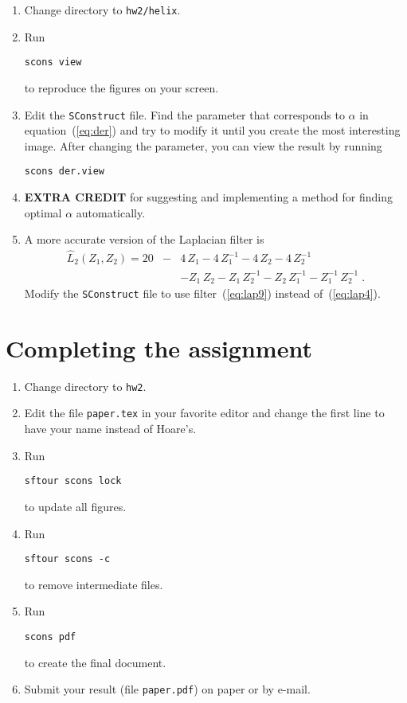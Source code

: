 \begin{enumerate}
\item Change directory to \texttt{hw2/helix}.
\item Run 
\begin{verbatim}
scons view
\end{verbatim}
to reproduce the figures on your screen.
\item Edit the \texttt{SConstruct} file. Find the parameter that corresponds to $\alpha$ in equation~(\ref{eq:der}) and try to modify it until you create the most interesting image. After changing the parameter, you can view the result by running
\begin{verbatim}
scons der.view
\end{verbatim}
\item \textbf{EXTRA CREDIT} for suggesting and implementing a method for finding optimal $\alpha$ automatically.
\item A more accurate version of the Laplacian filter is
\begin{eqnarray}
\nonumber
\hat{L}_2(Z_1,Z_2) = 20 & - & 4\,Z_1 - 4\,Z_1^{-1} - 4\,Z_2 - 4\,Z_2^{-1} \\
&  & - Z_1\,Z_2 - Z_1\,Z_2^{-1} - Z_2\,Z_1^{-1} - Z_1^{-1}\,Z_2^{-1}\;.
\label{eq:lap9}
\end{eqnarray}
Modify the \texttt{SConstruct} file to use filter~(\ref{eq:lap9}) instead of~(\ref{eq:lap4}).
\end{enumerate}

\lstset{language=python,numbers=left,numberstyle=\tiny,showstringspaces=false}


\section{Completing the assignment}

\begin{enumerate}
\item Change directory to \texttt{hw2}.
\item Edit the file \texttt{paper.tex} in your favorite editor and change the
  first line to have your name instead of Hoare's.
\item Run
\begin{verbatim}
sftour scons lock
\end{verbatim}
to update all figures.
\item Run
\begin{verbatim}
sftour scons -c
\end{verbatim}
to remove intermediate files.
\item Run
\begin{verbatim}
scons pdf
\end{verbatim}
to create the final document.
\item Submit your result (file \texttt{paper.pdf}) on paper or by
e-mail.
\end{enumerate}
